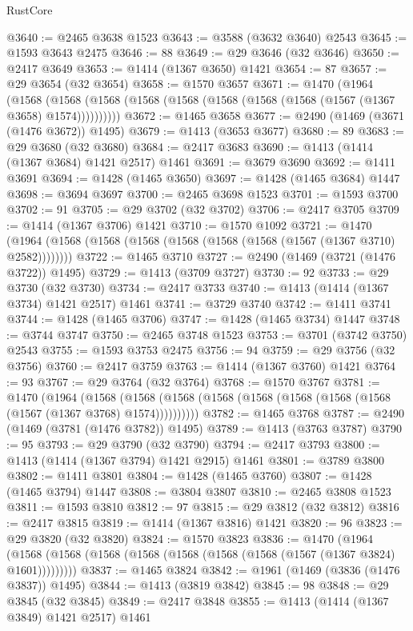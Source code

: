 \begin{lexlean}{RustCore}
\begin{coremodule}
@3640 := @2465 @3638 @1523
@3643 := @3588 (@3632 @3640) @2543
@3645 := @1593 @3643 @2475
@3646 := 88
@3649 := @29 @3646 (@32 @3646)
@3650 := @2417 @3649
@3653 := @1414 (@1367 @3650) @1421
@3654 := 87
@3657 := @29 @3654 (@32 @3654)
@3658 := @1570 @3657
@3671 := @1470
    (@1964
      (@1568 (@1568 (@1568 (@1568 (@1568 (@1568 (@1568 (@1568 (@1567 (@1367 @3658) @1574))))))))))
@3672 := @1465 @3658
@3677 := @2490 (@1469 (@3671 (@1476 @3672)) @1495)
@3679 := @1413 (@3653 @3677)
@3680 := 89
@3683 := @29 @3680 (@32 @3680)
@3684 := @2417 @3683
@3690 := @1413 (@1414 (@1367 @3684) @1421 @2517) @1461
@3691 := @3679 @3690
@3692 := @1411 @3691
@3694 := @1428 (@1465 @3650)
@3697 := @1428 (@1465 @3684) @1447
@3698 := @3694 @3697
@3700 := @2465 @3698 @1523
@3701 := @1593 @3700
@3702 := 91
@3705 := @29 @3702 (@32 @3702)
@3706 := @2417 @3705
@3709 := @1414 (@1367 @3706) @1421
@3710 := @1570 @1092
@3721 := @1470 (@1964 (@1568 (@1568 (@1568 (@1568 (@1568 (@1568 (@1567 (@1367 @3710) @2582))))))))
@3722 := @1465 @3710
@3727 := @2490 (@1469 (@3721 (@1476 @3722)) @1495)
@3729 := @1413 (@3709 @3727)
@3730 := 92
@3733 := @29 @3730 (@32 @3730)
@3734 := @2417 @3733
@3740 := @1413 (@1414 (@1367 @3734) @1421 @2517) @1461
@3741 := @3729 @3740
@3742 := @1411 @3741
@3744 := @1428 (@1465 @3706)
@3747 := @1428 (@1465 @3734) @1447
@3748 := @3744 @3747
@3750 := @2465 @3748 @1523
@3753 := @3701 (@3742 @3750) @2543
@3755 := @1593 @3753 @2475
@3756 := 94
@3759 := @29 @3756 (@32 @3756)
@3760 := @2417 @3759
@3763 := @1414 (@1367 @3760) @1421
@3764 := 93
@3767 := @29 @3764 (@32 @3764)
@3768 := @1570 @3767
@3781 := @1470
    (@1964
      (@1568 (@1568 (@1568 (@1568 (@1568 (@1568 (@1568 (@1568 (@1567 (@1367 @3768) @1574))))))))))
@3782 := @1465 @3768
@3787 := @2490 (@1469 (@3781 (@1476 @3782)) @1495)
@3789 := @1413 (@3763 @3787)
@3790 := 95
@3793 := @29 @3790 (@32 @3790)
@3794 := @2417 @3793
@3800 := @1413 (@1414 (@1367 @3794) @1421 @2915) @1461
@3801 := @3789 @3800
@3802 := @1411 @3801
@3804 := @1428 (@1465 @3760)
@3807 := @1428 (@1465 @3794) @1447
@3808 := @3804 @3807
@3810 := @2465 @3808 @1523
@3811 := @1593 @3810
@3812 := 97
@3815 := @29 @3812 (@32 @3812)
@3816 := @2417 @3815
@3819 := @1414 (@1367 @3816) @1421
@3820 := 96
@3823 := @29 @3820 (@32 @3820)
@3824 := @1570 @3823
@3836 := @1470
    (@1964 (@1568 (@1568 (@1568 (@1568 (@1568 (@1568 (@1568 (@1567 (@1367 @3824) @1601)))))))))
@3837 := @1465 @3824
@3842 := @1961 (@1469 (@3836 (@1476 @3837)) @1495)
@3844 := @1413 (@3819 @3842)
@3845 := 98
@3848 := @29 @3845 (@32 @3845)
@3849 := @2417 @3848
@3855 := @1413 (@1414 (@1367 @3849) @1421 @2517) @1461

\end{coremodule}
\end{lexlean}
